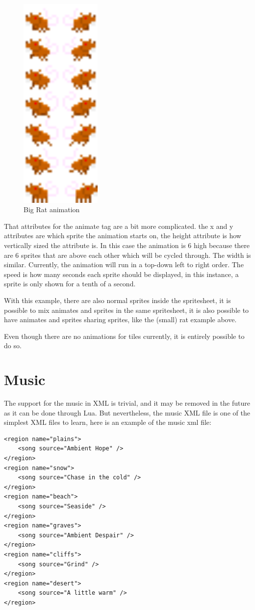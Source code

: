 \documentclass{book}
\begin{document}
\begin{figure}[ht!]
		\centering
		\includegraphics[width=40mm]{BigRatAnim.png}
		\caption{Big Rat animation}
\end{figure}

That attributes for the animate tag are a bit more complicated. the x and y attributes are which sprite the animation starts on, the height attribute is how vertically sized the attribute is. In this case the animation is 6 high because there are 6 sprites that are above each other which will be cycled through. The width is similar. Currently, the animation will run in a top-down left to right order. The speed is how many seconds each sprite should be displayed, in this instance, a sprite is only shown for a tenth of a second.

With this example, there are also normal sprites inside the spritesheet, it is possible to mix animates and sprites in the same spritesheet, it is also possible to have animates and sprites sharing sprites, like the (small) rat example above.

Even though there are no animations for tiles currently, it is entirely possible to do so.

\section{Music}
The support for the music in XML is trivial, and it may be removed in the future as it can be done through Lua. But nevertheless, the music XML file is one of the simplest XML files to learn, here is an example of the music xml file:
\begin{verbatim}
<region name="plains">
	<song source="Ambient Hope" />
</region>
<region name="snow">
	<song source="Chase in the cold" />
</region>
<region name="beach">
	<song source="Seaside" />
</region>
<region name="graves">
    <song source="Ambient Despair" />
</region>
<region name="cliffs">
	<song source="Grind" />
</region>
<region name="desert">
	<song source="A little warm" />
</region>
\end{verbatim}
\end{document}
